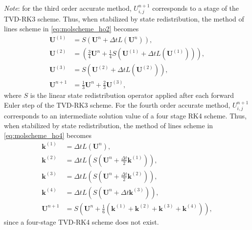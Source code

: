 \textit{Note}: for the third order accurate method, $U^{n+1}_{i,j}$ corresponds to a stage of the TVD-RK3 scheme.  Thus, when stabilized by state redistribution, the method of lines scheme in \eqref{eq:molscheme_ho2} becomes
\begin{equation}\label{eq:molscheme_ho2_srd}
\begin{aligned}
\mathbf{U}^{(1)} &= S\left(\mathbf{U}^{n} + \Delta t L(\mathbf{U}^n) \right), \\
\mathbf{U}^{(2)} &=  \left(\frac{3}{4}\mathbf{U}^{n} + \frac{1}{4}S(\mathbf{U}^{(1)} + \Delta t L(\mathbf{U}^{(1)})) \right), \\
\mathbf{U}^{(3)} &= S\left(\mathbf{U}^{(2)} + \Delta t L(\mathbf{U}^{(2)}) \right),  \\
\mathbf{U}^{n+1} &= \frac{1}{3}\mathbf{U}^{n} + \frac{2}{3}\mathbf{U}^{(3)},	
\end{aligned}
\end{equation}
where $S$ is the linear state redistribution operator applied after each forward Euler step of the TVD-RK3 scheme.
For the fourth order accurate method, $U^{n+1}_{i,j}$ corresponds to an intermediate solution value of a four stage RK4 scheme.  Thus, when stabilized by state redistribution, the method of lines scheme in \eqref{eq:molscheme_ho4} becomes
\begin{equation}\label{eq:molscheme_ho4_srd}
\begin{aligned}
\mathbf{k}^{(1)} &= \Delta t L(\mathbf{U}^n), \\
\mathbf{k}^{(2)} &= \Delta t L \left(S\left(\mathbf{U}^n + \frac{\Delta t}{2} \mathbf{k}^{(1)}\right) \right), \\	
\mathbf{k}^{(3)} &= \Delta t L \left(S\left(\mathbf{U}^n + \frac{\Delta t}{2} \mathbf{k}^{(2)}\right) \right), \\	
\mathbf{k}^{(4)} &= \Delta t L \left(S\left(\mathbf{U}^n + \Delta t \mathbf{k}^{(3)} \right) \right), \\	
\mathbf{U}^{n+1} &= S\left(\mathbf{U}^n + \frac{1}{6}(\mathbf{k}^{(1)} + \mathbf{k}^{(2)}+ \mathbf{k}^{(3)}+ \mathbf{k}^{(4)})\right),
\end{aligned}
\end{equation}
since a four-stage TVD-RK4 scheme does not exist.


